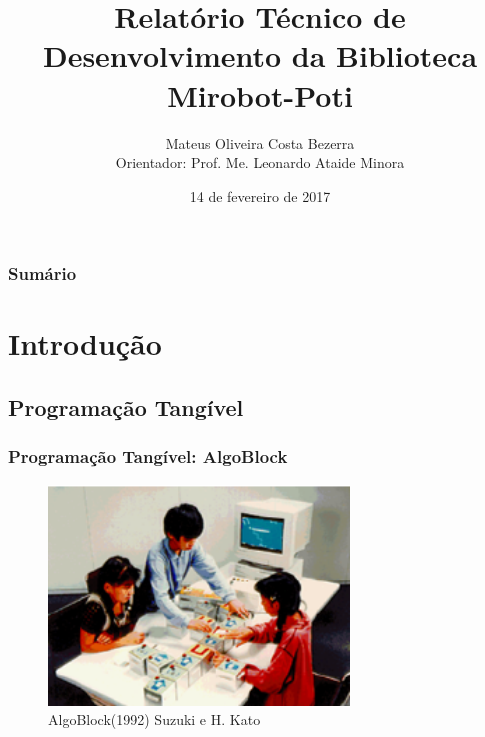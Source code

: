 \documentclass{beamer}
\begin{document}
 
\title[IFRN - CNAT]
      {Relatório Técnico de Desenvolvimento da Biblioteca Mirobot-Poti}
      \author[Mateus Oliveira Costa Bezerra]
             {Mateus Oliveira Costa Bezerra \\ Orientador: Prof. Me. Leonardo Ataide Minora}
  \date{14 de fevereiro de 2017}

\begin{frame}
  \label{capa}
  \maketitle
\end{frame}

\begin{frame}
  \label{sumario}
  \frametitle{Sumário}
  \tableofcontents
  
\end{frame}

\begin{frame}
  \label{tangivel}
  \section{Introdução}
  \subsection{Programação Tangível}
  \frametitle{Programação Tangível: AlgoBlock}
       \begin{center}
         \begin{figure}
           
         \includegraphics[width=8cm]{imagens/tangible.png}
          \caption{\tiny AlgoBlock(1992) Suzuki e H. Kato}
         \end{figure}


     \end{center}
\end{frame}
\end{document}
